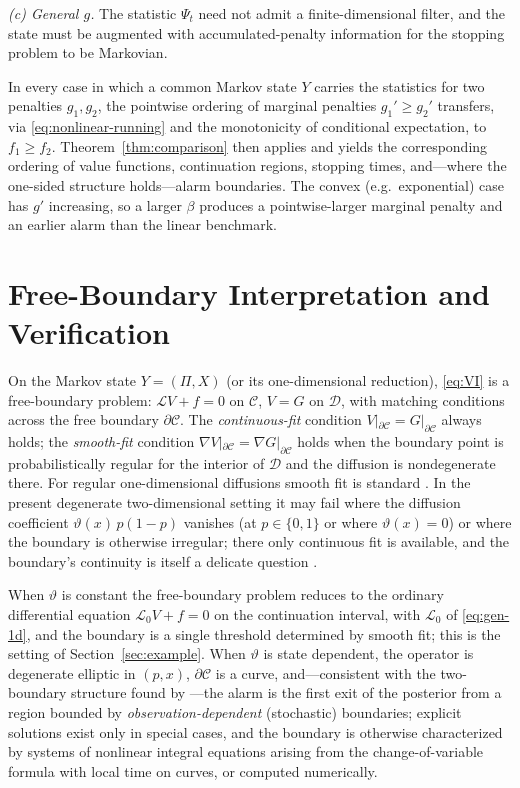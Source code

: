\documentclass[pdflatex,sn-mathphys-num]{sn-jnl}
\theoremstyle{plain}
\theoremstyle{definition}
\newcommand{\Lgen}{\mathscr{L}}
\newcommand{\snr}{\vartheta}
\newcommand{\post}{\Pi}
\begin{document}
\emph{(c) General $g$.} The statistic $\Psi_t$ need not admit a finite-dimensional
filter, and the state must be augmented with accumulated-penalty information for
the stopping problem to be Markovian.

In every case in which a common Markov state $Y$ carries the statistics for two
penalties $g_1,g_2$, the pointwise ordering of marginal penalties
$g_1'\ge g_2'$ transfers, via \eqref{eq:nonlinear-running} and the monotonicity of
conditional expectation, to $f_1\ge f_2$. Theorem~\ref{thm:comparison} then
applies and yields the corresponding ordering of value functions, continuation
regions, stopping times, and---where the one-sided structure holds---alarm
boundaries. The convex (e.g.\ exponential) case has $g'$ increasing, so a larger
$\beta$ produces a pointwise-larger marginal penalty and an earlier alarm than the
linear benchmark.

\section{Free-Boundary Interpretation and Verification}\label{sec:fb}

On the Markov state $Y=(\post,X)$ (or its one-dimensional reduction),
\eqref{eq:VI} is a free-boundary problem: $\Lgen V+f=0$ on $\mathcal C$, $V=G$ on
$\mathcal D$, with matching conditions across the free boundary
$\partial\mathcal C$. The \emph{continuous-fit} condition
$V|_{\partial\mathcal C}=G|_{\partial\mathcal C}$ always holds; the
\emph{smooth-fit} condition $\nabla V|_{\partial\mathcal C}=\nabla
G|_{\partial\mathcal C}$ holds when the boundary point is probabilistically
regular for the interior of $\mathcal D$ and the diffusion is nondegenerate there.
For regular one-dimensional diffusions smooth fit is standard
\citep{peskir2006optimal}. In the present degenerate two-dimensional setting it
may fail where the diffusion coefficient $\snr(x)\,p(1-p)$ vanishes (at $p\in\{0,1\}$
or where $\snr(x)=0$) or where the boundary is otherwise irregular; there only
continuous fit is available, and the boundary's continuity is itself a delicate
question \citep{peskir2019continuity}.

When $\snr$ is constant the free-boundary problem reduces to the ordinary
differential equation $\Lgen_0 V+f=0$ on the continuation interval, with
$\Lgen_0$ of \eqref{eq:gen-1d}, and the boundary is a single threshold determined
by smooth fit; this is the setting of Section~\ref{sec:example}. When $\snr$ is
state dependent, the operator is degenerate elliptic in $(p,x)$,
$\partial\mathcal C$ is a curve, and---consistent with the two-boundary structure
found by \citet{gapeev2011sequential}---the alarm is the first exit of the posterior
from a region bounded by \emph{observation-dependent} (stochastic) boundaries;
explicit solutions exist only in special cases, and the boundary is otherwise
characterized by systems of nonlinear integral equations arising from the
change-of-variable formula with local time on curves, or computed numerically.
\end{document}
